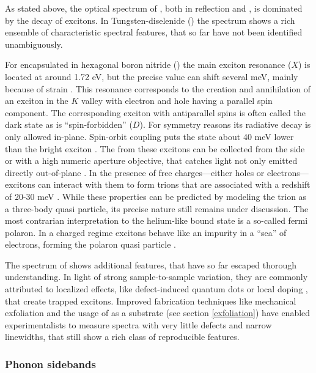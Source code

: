 As stated above, the optical spectrum of \tmds\!, both in reflection and \pl\!, is dominated by the decay of excitons. In Tungsten-diselenide (\wse\!) the \pl spectrum shows a rich ensemble of characteristic spectral features, that so far have not been identified unambiguously. 

For \wse encapsulated in hexagonal boron nitride (\hbn) the main exciton resonance ($X$) is located at around 1.72 eV, but the precise value can shift several meV, mainly because of strain \cite{zhu_strain_2013}. This resonance corresponds to the creation and annihilation of an exciton in the $K$ valley with electron and hole having a parallel spin component. The corresponding exciton with antiparallel spins is often called the dark state as is ``spin-forbidden'' ($D$). For symmetry reasons its radiative decay is only allowed in-plane. Spin-orbit coupling puts the state about 40 meV lower than the bright exciton \cite{echeverry_splitting_2016}. The \pl from these excitons can be collected from the side or with a high numeric aperture objective, that catches light not only emitted directly out-of-plane \cite{robert_fine_2017, wang_-plane_2017}. In the presence of free charges---either holes or electrons--- excitons can interact with them to form trions that are associated with a redshift of 20-30 meV \cite{courtade_charged_2017}. While these properties can be predicted by modeling the trion as a three-body quasi particle, its precise nature still remains under discussion. The most contrarian interpretation to the helium-like bound state is a so-called fermi polaron. In a charged regime excitons behave like an impurity in a ``sea'' of electrons, forming the polaron quasi particle \cite{sidler_fermi_2016, efimkin_many-body_2017,schmidt_fermi_2012}.

The spectrum of \wse shows additional features, that have so far escaped thorough understanding. In light of strong sample-to-sample variation, they are commonly attributed to localized effects, like defect-induced quantum dots or local doping \cite{kato_optical_2014, zhang_defect_2017}, that create trapped excitons. Improved fabrication techniques like mechanical exfoliation and the usage of \hbng as a substrate (see section \ref{exfoliation}) have enabled experimentalists to measure spectra with very little defects and narrow linewidths, that still show a rich class of reproducible features.

\subsubsection{Phonon sidebands}\label{sidebands}

